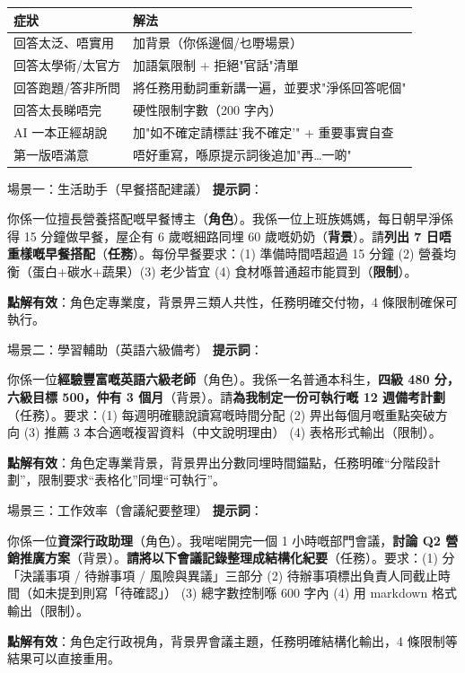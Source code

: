 
\begin{center}
\begin{tabularx}{\linewidth}{|X|X|}
\hline
\textbf{症狀} & \textbf{解法} \tabularnewline
\hline
回答太泛、唔實用 & 加背景（你係邊個/乜嘢場景） \tabularnewline
回答太學術/太官方 & 加語氣限制 + 拒絕"官話"清單 \tabularnewline
回答跑題/答非所問 & 將任務用動詞重新講一遍，並要求"淨係回答呢個" \tabularnewline
回答太長睇唔完 & 硬性限制字數（200 字內） \tabularnewline
AI 一本正經胡說 & 加"如不確定請標註'我不確定'" + 重要事實自查 \tabularnewline
第一版唔滿意 & 唔好重寫，喺原提示詞後追加"再…一啲" \tabularnewline
\hline
\end{tabularx}
\end{center}


\begin{tcbinfo}{場景一：生活助手（早餐搭配建議）}
\textbf{提示詞}：

你係一位擅長營養搭配嘅早餐博主（\textbf{角色}）。我係一位上班族媽媽，每日朝早淨係得 15 分鐘做早餐，屋企有 6 歲嘅細路同埋 60 歲嘅奶奶（\textbf{背景}）。請\textbf{列出 7 日唔重樣嘅早餐搭配}（\textbf{任務}）。每份早餐要求：(1) 準備時間唔超過 15 分鐘 (2) 營養均衡（蛋白+碳水+蔬果）(3) 老少皆宜 (4) 食材喺普通超市能買到（\textbf{限制}）。

\textbf{點解有效}：角色定專業度，背景畀三類人共性，任務明確交付物，4 條限制確保可執行。

\end{tcbinfo}

\begin{tcbinfo}{場景二：學習輔助（英語六級備考）}
\textbf{提示詞}：

你係一位\textbf{經驗豐富嘅英語六級老師}（角色）。我係一名普通本科生，\textbf{四級 480 分，六級目標 500，仲有 3 個月}（背景）。請\textbf{為我制定一份可執行嘅 12 週備考計劃}（任務）。要求：(1) 每週明確聽說讀寫嘅時間分配 (2) 畀出每個月嘅重點突破方向 (3) 推薦 3 本合適嘅複習資料（中文說明理由） (4) 表格形式輸出（限制）。

\textbf{點解有效}：角色定專業背景，背景畀出分數同埋時間錨點，任務明確“分階段計劃”，限制要求“表格化”同埋“可執行”。

\end{tcbinfo}

\begin{tcbinfo}{場景三：工作效率（會議紀要整理）}
\textbf{提示詞}：

你係一位\textbf{資深行政助理}（角色）。我啱啱開完一個 1 小時嘅部門會議，\textbf{討論 Q2 營銷推廣方案}（背景）。\textbf{請將以下會議記錄整理成結構化紀要}（任務）。要求：(1) 分「決議事項 / 待辦事項 / 風險與異議」三部分 (2) 待辦事項標出負責人同截止時間（如未提到則寫「待確認」） (3) 總字數控制喺 600 字內 (4) 用 markdown 格式輸出（限制）。

\textbf{點解有效}：角色定行政視角，背景畀會議主題，任務明確結構化輸出，4 條限制等結果可以直接重用。

\end{tcbinfo}

